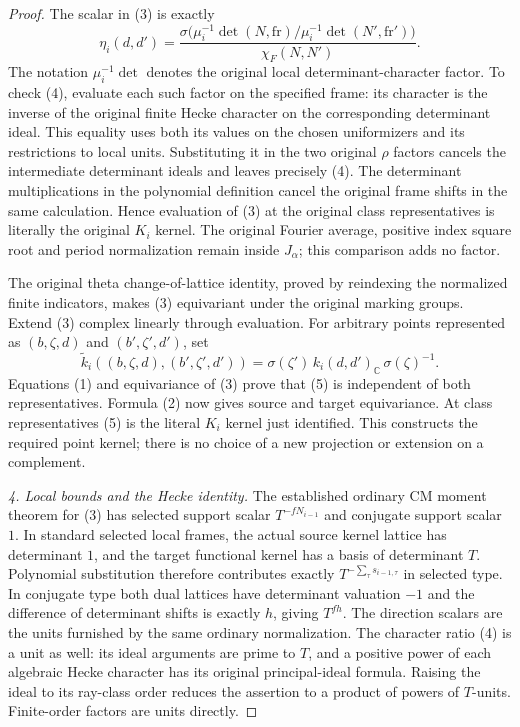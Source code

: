 \begin{proof}
The scalar in (3) is exactly
\[
 \eta_i(d,d')=
 \frac{\sigma\bigl(\mu_i^{-1}\!\det(N,\mathrm{fr})/
                          \mu_i^{-1}\!\det(N',\mathrm{fr}')\bigr)}
      {\chi_F(N,N')}.                                         \tag{4}
\]
The notation $\mu_i^{-1}\!\det$ denotes the original local
determinant-character factor.  To check (4), evaluate each such
factor on the specified frame: its character is the inverse of
the original finite Hecke character on the corresponding determinant
ideal.  This equality uses both its values on the chosen uniformizers
and its restrictions to local units.  Substituting it in the two
original $\rho$ factors cancels the intermediate determinant ideals
and leaves precisely (4).  The determinant multiplications in the
polynomial definition cancel the original frame shifts in the same
calculation.  Hence evaluation of (3) at the original class
representatives is literally the original $K_i$ kernel.  The original
Fourier average, positive index square root and period normalization
remain inside $J_\alpha$; this comparison adds no factor.

The original theta change-of-lattice identity, proved by reindexing
the normalized finite indicators, makes (3) equivariant under the
original marking groups.  Extend (3) complex linearly through
evaluation.  For arbitrary points represented as
$(b,\zeta,d)$ and $(b',\zeta',d')$, set
\[
 \widetilde k_i((b,\zeta,d),(b',\zeta',d'))
     =\sigma(\zeta')\,k_i(d,d')_{\mathbb C}\,\sigma(\zeta)^{-1}.
                                                               \tag{5}
\]
Equations (1) and equivariance of (3) prove that (5) is independent
of both representatives.  Formula (2) now gives source and target
equivariance.  At class representatives (5) is the literal $K_i$
kernel just identified.  This constructs the required point kernel;
there is no choice of a new projection or extension on a complement.

\emph{4. Local bounds and the Hecke identity.}
The established ordinary CM moment theorem for (3) has selected
support scalar $T^{-fN_{i-1}}$ and conjugate support scalar $1$.
In standard selected local frames, the actual source kernel lattice
has determinant $1$, and the target functional kernel has a basis
of determinant $T$.  Polynomial substitution therefore contributes
exactly $T^{-\sum_\tau s_{i-1,\tau}}$ in selected type.  In conjugate
type both dual lattices have determinant valuation $-1$ and the
difference of determinant shifts is exactly $h$, giving $T^{fh}$.
The direction scalars are the units furnished by the same ordinary
normalization.  The character ratio (4) is a unit as well: its ideal
arguments are prime to $T$, and a positive power of each algebraic
Hecke character has its original principal-ideal formula.  Raising
the ideal to its ray-class order reduces the assertion to a product
of powers of $T$-units.  Finite-order factors are units directly.


\end{proof}
